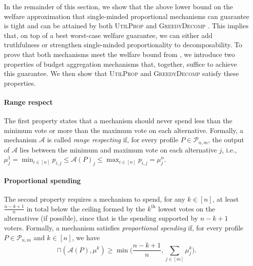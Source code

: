 \documentclass[11pt]{article}
\newcommand{\A}{\mathcal{A}}
\newcommand{\overlap}[2]{\sqcap(#1, #2)}
\newcommand{\UtP}{\textsc{UtilProp} }
\newcommand{\GrdDec}{\textsc{GreedyDecomp} }
\begin{document}
In the remainder of this section, we show that the above lower bound on the welfare approximation that single-minded proportional mechanisms can guarantee is tight and can be attained by both \UtP and \GrdDec.
This implies that, on top of a best worst-case welfare guarantee, we can either add truthfulness or strengthen single-minded proportionality to decomposability.
To prove that both mechanisms meet the welfare bound from , we introduce two properties of budget aggregation mechanisms that, together, suffice to achieve this guarantee. We then show that \UtP and \GrdDec satisfy these properties. 

\paragraph{Range respect}
The first property states that a mechanism should never spend less than the minimum vote or more than the maximum vote on each alternative.
Formally, a mechanism $\A$ is called \emph{range respecting} if, for every profile $P \in \mathcal{P}_{n,m}$, the output of $\A$ lies between the minimum and maximum vote on each alternative $j$, i.e., $\mu^1_j = \min_{i \in [n]} p_{i,j} \le \A(P)_j \le \max_{i \in [n]} p_{i,j} = \mu^n_j$.

\paragraph{Proportional spending} The second property requires a mechanism to spend, for any $k \in [n]$, at least $\frac{n-k+1}{n}$ 
in total below the ceiling formed by the $k^\text{th}$ lowest votes on the alternatives (if possible), 
since that is the spending supported by $n-k+1$ voters.
Formally, a mechanism satisfies \emph{proportional spending} if, for every profile $P \in \mathcal{P}_{n,m}$ and $k \in [n]$, we have 
\[
    \overlap{\A(P)}{\mu^k} \ge \min\Bigg( \frac{n-k+1}{n}, \sum_{j \in [m]} \mu^k_j \Bigg).
\]
\end{document}
